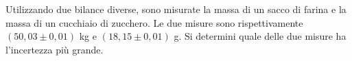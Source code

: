 Utilizzando due bilance diverse, sono misurate la massa 
di un sacco di farina e la massa di un cuc\-chia\-io di zucchero. 
Le due misure sono rispettivamente $(50,03 \pm 0,01)$ kg e 
$(18,15 \pm 0,01)$ g. 
Si determini quale delle due misure ha l'incertezza più 
grande.